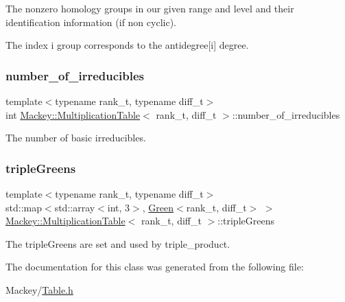 The nonzero homology groups in our given range and level and their identification information (if non cyclic). 

The index i group corresponds to the antidegree\mbox{[}i\mbox{]} degree. \mbox{\label{classMackey_1_1MultiplicationTable_a2a87b9a2f25f4e99c903c8f874fad4fb}} 
\subsubsection{\texorpdfstring{number\+\_\+of\+\_\+irreducibles}{number\_of\_irreducibles}}
{\footnotesize\ttfamily template$<$typename rank\+\_\+t, typename diff\+\_\+t$>$ \\
int \hyperlink{classMackey_1_1MultiplicationTable}{Mackey\+::\+Multiplication\+Table}$<$ rank\+\_\+t, diff\+\_\+t $>$\+::number\+\_\+of\+\_\+irreducibles\hspace{0.3cm}{\ttfamily [protected]}}



The number of basic irreducibles. 

\mbox{\label{classMackey_1_1MultiplicationTable_af6b2afae20bd4a120e9792d1a9dce837}} 
\subsubsection{\texorpdfstring{triple\+Greens}{tripleGreens}}
{\footnotesize\ttfamily template$<$typename rank\+\_\+t, typename diff\+\_\+t$>$ \\
std\+::map$<$std\+::array$<$int, 3$>$, \hyperlink{classMackey_1_1Green}{Green}$<$rank\+\_\+t, diff\+\_\+t$>$ $>$ \hyperlink{classMackey_1_1MultiplicationTable}{Mackey\+::\+Multiplication\+Table}$<$ rank\+\_\+t, diff\+\_\+t $>$\+::triple\+Greens\hspace{0.3cm}{\ttfamily [protected]}}



The triple\+Greens are set and used by triple\+\_\+product. 



The documentation for this class was generated from the following file\+:\begin{DoxyCompactItemize}
\item 
Mackey/\hyperlink{Table_8h}{Table.\+h}\end{DoxyCompactItemize}
